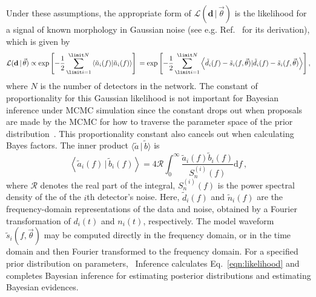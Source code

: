 Under these assumptions, the appropriate form of $\mathcal{L}(\mathbf{d} \, | \, \vec{\theta})$
is the likelihood for a signal of known morphology in Gaussian noise (see
e.g.  Ref.~\cite{Wainstein:1962} for its derivation), which is
given by
\begin{equation}\label{eqn:likelihood}
    \mathcal{L}(\mathbf{d} \, | \, \vec{\theta}) \propto \exp \left[ -\frac{1}{2} \sum_{\limit i = 1}^{\limit N} \left \langle \tilde{n}_{i}(f) | \tilde{n}_{i}(f)\right\rangle \right] \\ 
      = \exp \left[ -\frac{1}{2} \sum_{\limit i = 1}^{\limit N} \left \langle \tilde{d}_{i}(f) - \tilde{s}_{i}(f, \vec{\theta})| \tilde{d}_{i}(f) - \tilde{s}_{i}(f, \vec{\theta})\right \rangle \right] ,
\end{equation}
where $N$ is the number of detectors in the network. The constant of proportionality for this Gaussian likelihood
is not important for Bayesian inference under MCMC simulation since the constant drops out
when proposals are made by the MCMC for how to traverse the parameter space of the prior distribution~\cite{cbiwer_thesis}.
This proportionality constant also cancels out when calculating Bayes factors.
The inner product $\langle\tilde{a} \, | \, \tilde{b}\rangle$ is
\begin{equation}
    \left \langle \tilde{a}_i(f) \, | \, \tilde{b}_i(f)\right \rangle = 4 \mathcal{R} \int_{0}^{\infty} \frac{\tilde{a}_i(f) \tilde{b}_i(f)}{S^{(i)}_n(f)} \mathrm{d}f \,,
\end{equation}
where $\mathcal{R}$ denotes the real part of the integral,
$S^{(i)}_n(f)$ is the power spectral density of the of the $i$th
detector's noise. Here, $\tilde{d}_{i}(f)$ and $\tilde{n}_{i}(f)$ are the
frequency-domain representations of the data and noise, obtained by a Fourier
transformation of $d_{i}(t)$ and $n_{i}(t)$, respectively. The model waveform
$\tilde{s}_{i}(f, \vec{\theta})$ may be computed directly in the frequency
domain, or in the time domain and then Fourier transformed to the frequency
domain. For a specified prior distribution on parameters,
\pycbc{}\ Inference calculates Eq.~\ref{eqn:likelihood} and
completes Bayesian inference for estimating posterior distributions and
estimating Bayesian evidences.

